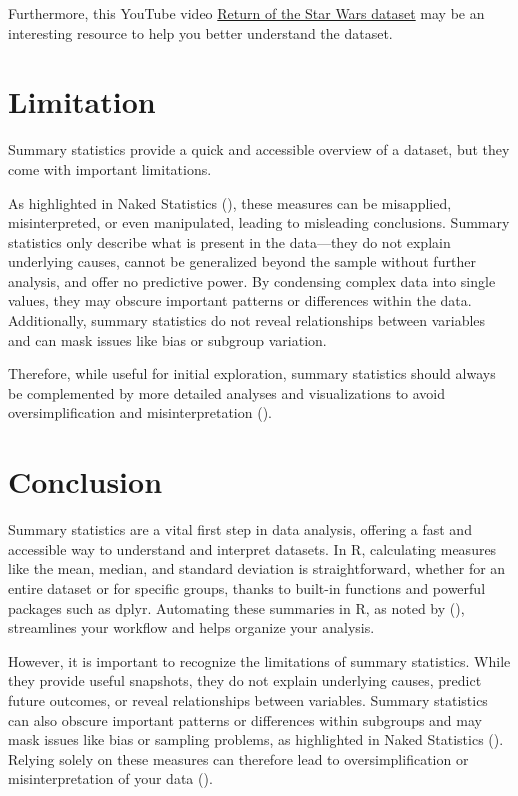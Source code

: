 \documentclass[
  man,
  floatsintext,
  longtable,
  nolmodern,
  notxfonts,
  notimes,
  colorlinks=true,linkcolor=blue,citecolor=blue,urlcolor=blue]{apa7}
\begin{document}
Furthermore, this YouTube video
\href{https://www.youtube.com/watch?v=4vSfbz9YMa0}{Return of the Star
Wars dataset} may be an interesting resource to help you better
understand the dataset.

\section{Limitation}\label{limitation}

Summary statistics provide a quick and accessible overview of a dataset,
but they come with important limitations.

As highlighted in Naked Statistics
(), these measures can be
misapplied, misinterpreted, or even manipulated, leading to misleading
conclusions. Summary statistics only describe what is present in the
data---they do not explain underlying causes, cannot be generalized
beyond the sample without further analysis, and offer no predictive
power. By condensing complex data into single values, they may obscure
important patterns or differences within the data. Additionally, summary
statistics do not reveal relationships between variables and can mask
issues like bias or subgroup variation.

Therefore, while useful for initial exploration, summary statistics
should always be complemented by more detailed analyses and
visualizations to avoid oversimplification and misinterpretation
().

\section{Conclusion}\label{conclusion}

Summary statistics are a vital first step in data analysis, offering a
fast and accessible way to understand and interpret datasets. In R,
calculating measures like the mean, median, and standard deviation is
straightforward, whether for an entire dataset or for specific groups,
thanks to built-in functions and powerful packages such as dplyr.
Automating these summaries in R, as noted by
(), streamlines your
workflow and helps organize your analysis.

However, it is important to recognize the limitations of summary
statistics. While they provide useful snapshots, they do not explain
underlying causes, predict future outcomes, or reveal relationships
between variables. Summary statistics can also obscure important
patterns or differences within subgroups and may mask issues like bias
or sampling problems, as highlighted in Naked Statistics
(). Relying solely on
these measures can therefore lead to oversimplification or
misinterpretation of your data
().
\end{document}
